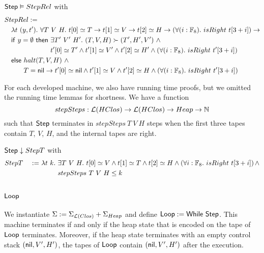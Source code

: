 \begin{lemma}
  \label{lem:Step_Realise}
  $\mathsf{Step} \mathrel{\vDash} StepRel$ with
  \begin{alignat*}{1}
    & StepRel := \\
    &\quad \lambda t~(y, t').~\forall T~V~H.~ t[0] \simeq T \rightarrow t[1] \simeq V \rightarrow t[2] \simeq H \rightarrow \left(\forall (i:\Fin_8).~isRight~t[3+i]\right) \rightarrow \\
    &\quad \MS{if}~y=\None~\MS{then}~\exists T'~V'~H'.~(T,V,H) \red (T',H',V') ~\land~ \\
    &\quad \phantom{\MS{if}~y=\None~\MS{then}}~ t'[0] \simeq T' \land t'[1] \simeq V' \land t'[2] \simeq H' \land \left(\forall (i:\Fin_8).~isRight~t'[3+i]\right) \\
    &\quad \MS{else}~ halt(T,V,H) ~\land~ \\
    &\quad \phantom{\MS{else}}~T=\nil \rightarrow t'[0] \simeq \nil \land t'[1] \simeq V \land t'[2] \simeq H \land \left(\forall (i:\Fin_8).~isRight~t'[3+i]\right)
  \end{alignat*}
\end{lemma}

For each developed machine, we also have running time proofs, but we omitted the running time lemmas for shortness.  We have a function
\[
  stepSteps : \mathcal{L}(HClos) \rightarrow \mathcal{L}(HClos) \rightarrow Heap \rightarrow \mathbb{N}
\]
such that $\mathsf{Step}$ terminates in $stepSteps~T~V~H$ steps when the first three tapes contain $T$, $V$, $H$, and the internal tapes are right.
\begin{lemma}
  \label{lem:Step_Terminates}
  $\mathsf{Step} \mathrel{\downarrow} StepT$ with
  \begin{alignat*}{3}
    & StepT &~:=~& \lambda t~k.~\exists T~V~H.~t[0] \simeq V \land t[1] \simeq T \land t[2] \simeq H \land \left(\forall i:\mathbb{F}_8.~isRight~t[3+i]\right) \land \\
    &       &    & \phantom{\lambda t~k.}~stepSteps~T~V~H \leq k
  \end{alignat*}
\end{lemma}


\subsection{$\mathsf{Loop}$}
\label{sec:heap-Loop}
%

We instantiate $\Sigma := \Sigma_{\mathcal{L}(Clos)} + \Sigma_{Heap}$ and define $\mathsf{Loop} := \mathsf{While}~\mathsf{Step}$.  This machine terminates if and only if
the heap state that is encoded on the tape of $\mathsf{Loop}$ terminates.  Moreover, if the heap state terminates with an empty control stack
$(\mathsf{nil}, V', H')$, the tapes of $\mathsf{Loop}$ contain $(\mathsf{nil}, V', H')$ after the execution.

